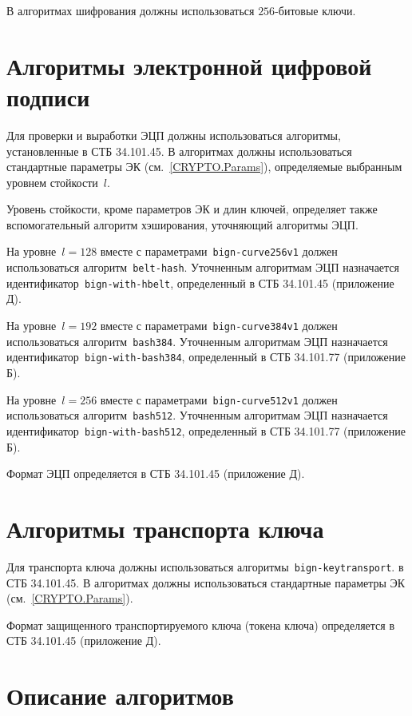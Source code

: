 В алгоритмах шифрования должны использоваться $256$-битовые ключи.

\section{Алгоритмы электронной цифровой подписи}\label{CRYPTO.Sign}

Для проверки и выработки ЭЦП должны использоваться алгоритмы,
установленные в СТБ 34.101.45. 
%
В алгоритмах должны использоваться стандартные параметры ЭК 
(см.~\ref{CRYPTO.Params}), определяемые выбранным уровнем стойкости~$l$.

Уровень стойкости, кроме параметров ЭК и длин ключей,
определяет также вспомогательный алгоритм хэширования,
уточняющий алгоритмы ЭЦП.

На уровне~$l=128$ вместе с параметрами~\texttt{bign-curve256v1}
должен использоваться алгоритм~\texttt{belt-hash}. 
Уточненным алгоритмам ЭЦП назначается идентификатор~\texttt{bign-with-hbelt}, 
определенный в СТБ 34.101.45 (приложение Д). 

На уровне~$l=192$ вместе с параметрами~\texttt{bign-curve384v1}
должен использоваться алгоритм~\texttt{bash384}. 
Уточненным алгоритмам ЭЦП назначается 
идентификатор~\texttt{bign-with-bash384},  
определенный в СТБ 34.101.77 (приложение Б).

На уровне~$l=256$ вместе с параметрами~\texttt{bign-curve512v1}
должен использоваться алгоритм~\texttt{bash512}. 
Уточненным алгоритмам ЭЦП назначается 
идентификатор~\texttt{bign-with-bash512},  
определенный в СТБ 34.101.77 (приложение Б).

Формат ЭЦП определяется в СТБ 34.101.45 (приложение Д).

\section{Алгоритмы транспорта ключа}\label{CRYPTO.Transport}

Для транспорта ключа должны использоваться алгоритмы~\texttt{bign-keytransport}.
 в СТБ 34.101.45. 
%
В алгоритмах должны использоваться стандартные параметры 
ЭК (см.~\ref{CRYPTO.Params}). 

Формат защищенного транспортируемого ключа (токена ключа)
определяется в СТБ 34.101.45 (приложение Д). 

\section{Описание алгоритмов}\label{CRYPTO.AlgId}

